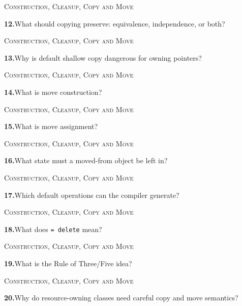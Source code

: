 \documentclass[11pt,a4paper]{article}
\newenvironment{questionblock}{%
  \begin{minipage}[t][0.455\textheight][t]{\textwidth}%
  \raggedright\small
}{%
  \vfill
  \end{minipage}%
}
\newcommand{\sectionlabel}[1]{\textsc{#1}\par\vspace{0.35em}}
\newcommand{\questionnumber}[1]{\textbf{#1.}\enspace}
\begin{document}
\begin{questionblock}
\sectionlabel{Construction, Cleanup, Copy and Move}
\questionnumber{12}What should copying preserve: equivalence, independence, or both?\par
\end{questionblock}
\newpage
\begin{questionblock}
\sectionlabel{Construction, Cleanup, Copy and Move}
\questionnumber{13}Why is default shallow copy dangerous for owning pointers?\par
\end{questionblock}
\vspace*{0.04\textheight}
\begin{questionblock}
\sectionlabel{Construction, Cleanup, Copy and Move}
\questionnumber{14}What is move construction?\par
\end{questionblock}
\newpage
\begin{questionblock}
\sectionlabel{Construction, Cleanup, Copy and Move}
\questionnumber{15}What is move assignment?\par
\end{questionblock}
\vspace*{0.04\textheight}
\begin{questionblock}
\sectionlabel{Construction, Cleanup, Copy and Move}
\questionnumber{16}What state must a moved-from object be left in?\par
\end{questionblock}
\newpage
\begin{questionblock}
\sectionlabel{Construction, Cleanup, Copy and Move}
\questionnumber{17}Which default operations can the compiler generate?\par
\end{questionblock}
\vspace*{0.04\textheight}
\begin{questionblock}
\sectionlabel{Construction, Cleanup, Copy and Move}
\questionnumber{18}What does \verb|= delete| mean?\par
\end{questionblock}
\newpage
\begin{questionblock}
\sectionlabel{Construction, Cleanup, Copy and Move}
\questionnumber{19}What is the Rule of Three/Five idea?\par
\end{questionblock}
\vspace*{0.04\textheight}
\begin{questionblock}
\sectionlabel{Construction, Cleanup, Copy and Move}
\questionnumber{20}Why do resource-owning classes need careful copy and move semantics?\par

\end{questionblock}
\end{document}
